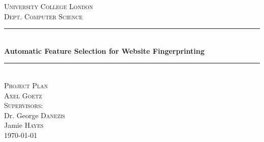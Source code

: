 \newcommand{\HRule}{\rule{\linewidth}{0.5mm}}

\begin{center}
  \textsc{\LARGE University College London}\\[0.5cm]
  \textsc{\Large Dept. Computer Science}\\[0.5cm]

  \HRule \\ [0.4cm]
  { \Large \bfseries Automatic Feature Selection for Website Fingerprinting}\\[0.3cm]
  \HRule \\ [0.4cm]

  \textsc{\LARGE Project Plan}\\[0.5cm]

  \textsc{\Large Axel Goetz}\\[0.5cm]
  \textsc{\large Supervisors:}\\[0.1cm]
  \normalsize Dr. George \textsc{Danezis}\\
  \normalsize Jamie \textsc{Hayes}\\
  \vspace{0.2cm}
  \today

\end{center}
